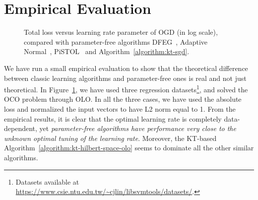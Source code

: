 \section{Empirical Evaluation}

\begin{figure}[t]
\centering
{}
\caption{\footnotesize{Total loss versus learning rate parameter of \ac{OGD} (in log scale), compared with parameter-free algorithms DFEG~\cite{Orabona-2013}, Adaptive Normal~\cite{McMahan-Orabona-2014}, PiSTOL~\cite{Orabona-2014} and Algorithm~\ref{algorithm:kt-sgd}.}}
\label{fig:exp_olo}
\end{figure}

We have run a small empirical evaluation to show that the theoretical difference
between classic learning algorithms and parameter-free ones is real and not just theoretical. In
Figure~\ref{fig:exp_olo}, we have used three regression
datasets\footnote{Datasets available at
\url{https://www.csie.ntu.edu.tw/~cjlin/libsvmtools/datasets/}.}, and solved the
\ac{OCO} problem through \ac{OLO}. In all the three cases, we have used the
absolute loss and normalized the input vectors to have L2 norm equal to 1. From
the empirical results, it is clear that the optimal learning rate is completely
data-dependent, yet \emph{parameter-free algorithms have performance very close
to the unknown optimal tuning of the learning rate}. Moreover, the KT-based
Algorithm~\ref{algorithm:kt-hilbert-space-olo} seems to dominate all the other
similar algorithms.